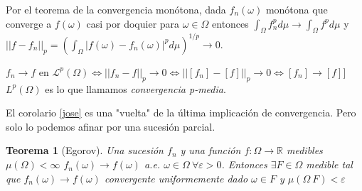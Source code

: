 \documentclass[11pt, a4paper]{article}
\newif\IfInSansMode
\theoremstyle{theorem-style}
\newtheorem{nth}{Teorema}[section]
\theoremstyle{definition-style}
\theoremstyle{remark-style}
\theoremstyle{example-style}
\begin{document}
Por el teorema de la convergencia monótona, dada $f_{n}(\omega)$ monótona que
converge a $f(\omega)$ casi por doquier para $\omega \in \Omega$ entonces
$\int_{\Omega}f_{n}^{p}d\mu \rightarrow \int_{\Omega}f^{p}d\mu$ y $||f - f_{n}||_{p}
= \left(\int_{\Omega}|f(\omega)-f_{n}(\omega)|^{p}d\mu\right)^{1/p} \rightarrow
0$.

$f_{n} \rightarrow f$ en $\mathcal L^{p}(\Omega) \Leftrightarrow ||f_{n}-f||_{p}
\rightarrow 0 \Leftrightarrow ||[f_{n}]-[f]||_{p} \rightarrow 0 \Leftrightarrow
{[f_{n}]} \rightarrow [f]]$ $L^{p}(\Omega)$ es lo que llamamos
\textit{convergencia p-media}. 

El corolario \ref{jose} es una "vuelta" de la última implicación de
convergencia. Pero solo lo podemos afinar por una sucesión parcial.

\begin{nth}[Egorov]
  Una sucesión  $f_{n}$ y una función $f:\Omega \rightarrow \mathbb R $ medibles
  $\mu(\Omega) < \infty $ ${f_{n}(\omega)} \rightarrow f(\omega)$ a.e. $ \omega \in \Omega \
  \forall \varepsilon > 0$. Entonces $ \exists F \in \Omega $ medible tal que
  ${f_{n}(\omega)} \rightarrow f(\omega)$ convergente uniformemente dado $\omega
  \in F$ y $\mu(\Omega \ F) < \varepsilon$
\end{nth}
\end{document}
